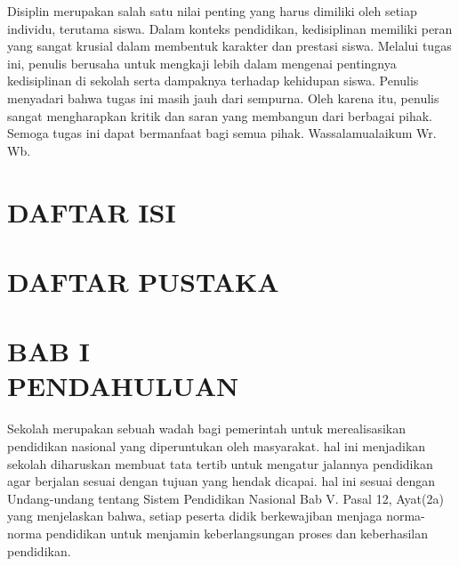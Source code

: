 \documentclass[f4paper,12pt, left=2.5cm,right=2cm,bottom=2cm, bahasa]{article}
\begin{document}
Disiplin merupakan salah satu nilai penting yang harus dimiliki oleh setiap individu, terutama siswa. Dalam konteks pendidikan, kedisiplinan memiliki peran yang sangat krusial dalam membentuk karakter dan prestasi siswa. Melalui tugas ini, penulis berusaha untuk mengkaji lebih dalam mengenai pentingnya kedisiplinan di sekolah serta dampaknya terhadap kehidupan siswa. Penulis menyadari bahwa tugas ini masih jauh dari sempurna. Oleh karena itu, penulis sangat mengharapkan kritik dan saran yang membangun dari berbagai pihak. Semoga tugas ini dapat bermanfaat bagi semua pihak. Wassalamualaikum Wr. Wb.\\
    
\vspace{3cm}
\pagebreak

    \section*{DAFTAR ISI}
\renewcommand{\cftdot}{.}
\tableofcontents



\vspace{3cm}
\section*{DAFTAR PUSTAKA}
\medskip
\printbibliography

\pagebreak
{}
\setcounter{page}{1}
\setcounter{section}{1}


\section*{BAB I \\PENDAHULUAN}
Sekolah merupakan sebuah wadah bagi pemerintah untuk merealisasikan pendidikan nasional yang diperuntukan oleh masyarakat.
hal ini menjadikan sekolah diharuskan membuat tata tertib untuk mengatur jalannya pendidikan agar berjalan sesuai dengan tujuan yang hendak dicapai. hal ini sesuai dengan Undang-undang tentang Sistem Pendidikan Nasional Bab V. Pasal 12, Ayat(2a) yang menjelaskan bahwa, setiap peserta didik berkewajiban menjaga norma-norma pendidikan untuk menjamin keberlangsungan proses dan keberhasilan pendidikan.
\end{document}
